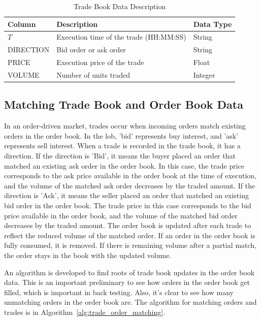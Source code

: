 \begin{table}[h] 
    \centering 
    \begin{tabular}{lll} 
        \toprule 
        \textbf{Column} & \textbf{Description} & \textbf{Data Type} \\ 
        \midrule 
        $T$ & Execution time of the trade (HH:MM:SS) & String \\
        DIRECTION & Bid order or ask order & String \\
        PRICE & Execution price of the trade & Float \\ 
        VOLUME & Number of units traded & Integer \\  
        \bottomrule 
    \end{tabular} 
    \caption{Trade Book Data Description}
    \label{tb: trade book data description}  
\end{table}

\subsection{Matching Trade Book and Order Book Data}
In an order-driven market, trades occur when incoming orders match existing orders in the order book. In the \gls{lob}, 'bid' represents buy interest, and 'ask' represents sell interest. When a trade is recorded in the trade book, it has a direction. If the direction is 'Bid', it means the buyer placed an order that matched an existing ask order in the order book. In this case, the trade price corresponds to the ask price available in the order book at the time of execution, and the volume of the matched ask order decreases by the traded amount. If the direction is 'Ask', it means the seller placed an order that matched an existing bid order in the order book. The trade price in this case corresponds to the bid price available in the order book, and the volume of the matched bid order decreases by the traded amount. The order book is updated after each trade to reflect the reduced volume of the matched order. If an order in the order book is fully consumed, it is removed. If there is remaining volume after a partial match, the order stays in the book with the updated volume. 

An algorithm is developed to find roots of trade book updates in the order book data. This is an important preliminary to see how orders in the order book get filled, which is important in back testing. Also, it's clear to see how many unmatching orders in the order book are. The algorithm for matching orders and trades is in Algorithm~\ref{alg:trade_order_matching}.

